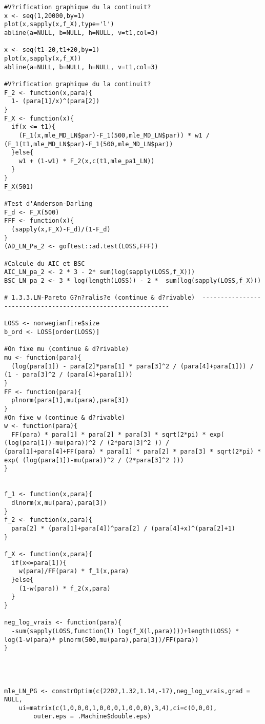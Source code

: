 \begin{verbatim}
#V?rification graphique du la continuit?
x <- seq(1,20000,by=1)
plot(x,sapply(x,f_X),type='l')
abline(a=NULL, b=NULL, h=NULL, v=t1,col=3)

x <- seq(t1-20,t1+20,by=1)
plot(x,sapply(x,f_X))
abline(a=NULL, b=NULL, h=NULL, v=t1,col=3)

#V?rification graphique du la continuit?
F_2 <- function(x,para){
  1- (para[1]/x)^(para[2])
}
F_X <- function(x){
  if(x <= t1){
    (F_1(x,mle_MD_LN$par)-F_1(500,mle_MD_LN$par)) * w1 / (F_1(t1,mle_MD_LN$par)-F_1(500,mle_MD_LN$par)) 
  }else{
    w1 + (1-w1) * F_2(x,c(t1,mle_pa1_LN))
  }
}
F_X(501)

#Test d'Anderson-Darling
F_d <- F_X(500)
FFF <- function(x){
  (sapply(x,F_X)-F_d)/(1-F_d)
}
(AD_LN_Pa_2 <- goftest::ad.test(LOSS,FFF))

#Calcule du AIC et BSC
AIC_LN_pa_2 <- 2 * 3 - 2* sum(log(sapply(LOSS,f_X)))
BSC_LN_pa_2 <- 3 * log(length(LOSS)) - 2 *  sum(log(sapply(LOSS,f_X)))

# 1.3.3.LN-Pareto G?n?ralis?e (continue & d?rivable)  -------------------------------------------------------------

LOSS <- norwegianfire$size
b_ord <- LOSS[order(LOSS)]

#On fixe mu (continue & d?rivable)
mu <- function(para){
  (log(para[1]) - para[2]*para[1] * para[3]^2 / (para[4]+para[1])) / (1 - para[3]^2 / (para[4]+para[1]))
}
FF <- function(para){
  plnorm(para[1],mu(para),para[3])
}
#On fixe w (continue & d?rivable)
w <- function(para){
  FF(para) * para[1] * para[2] * para[3] * sqrt(2*pi) * exp( (log(para[1])-mu(para))^2 / (2*para[3]^2 )) / (para[1]+para[4]+FF(para) * para[1] * para[2] * para[3] * sqrt(2*pi) * exp( (log(para[1])-mu(para))^2 / (2*para[3]^2 )))
}


f_1 <- function(x,para){
  dlnorm(x,mu(para),para[3])
}
f_2 <- function(x,para){
  para[2] * (para[1]+para[4])^para[2] / (para[4]+x)^(para[2]+1)
}

f_X <- function(x,para){
  if(x<=para[1]){
    w(para)/FF(para) * f_1(x,para)
  }else{
    (1-w(para)) * f_2(x,para)
  } 
}

neg_log_vrais <- function(para){
  -sum(sapply(LOSS,function(l) log(f_X(l,para))))+length(LOSS) * log(1-w(para)* plnorm(500,mu(para),para[3])/FF(para))
}




mle_LN_PG <- constrOptim(c(2202,1.32,1.14,-17),neg_log_vrais,grad = NULL,
	ui=matrix(c(1,0,0,0,1,0,0,0,1,0,0,0),3,4),ci=c(0,0,0),
		outer.eps = .Machine$double.eps)


\end{verbatim}
